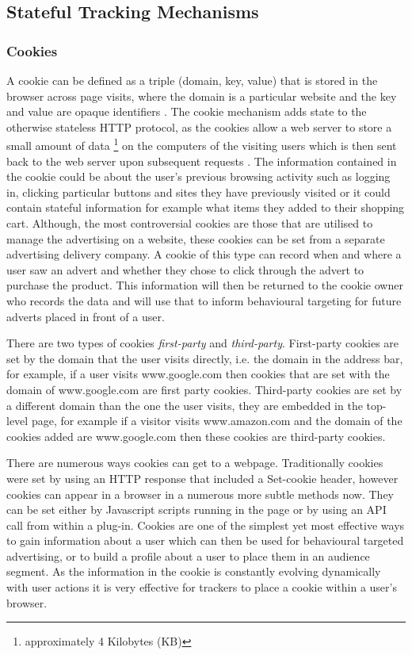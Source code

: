 \documentclass[12pt]{article}
\begin{document}
\subsection{Stateful Tracking Mechanisms}

\subsubsection {Cookies} \label{cookies}
A cookie can be defined as a triple (domain, key, value) that is stored in the browser across page visits, where the domain is a particular website and the key and value are opaque identifiers \parencite{roesner}. The cookie mechanism adds state to the otherwise stateless HTTP protocol, as the cookies allow a web server to store a small amount of data \footnote{approximately 4 Kilobytes (KB)} on the computers of the visiting users which is then sent back to the web server upon subsequent requests \parencite{cookielessMonster}. The information contained in the cookie could be about the user's previous browsing activity such as logging in, clicking particular buttons and sites they have previously visited or it could contain stateful information for example what items they added to their shopping cart. Although, the most controversial cookies are those that are utilised to manage the advertising on a website, these cookies can be set from a separate advertising delivery company. A cookie of this type can record when and where a user saw an advert and whether they chose to click through the advert to purchase the product. This information will then be returned to the cookie owner who records the data and will use that to inform behavioural targeting for future adverts placed in front of a user.  \newline 

There are two types of cookies \textit{first-party} and \textit{third-party}. First-party cookies are set by the domain that the user visits directly, i.e. the domain in the address bar, for example, if a user visits www.google.com then cookies that are set with the domain of www.google.com are first party cookies. Third-party cookies are set by a different domain than the one the user visits, they are embedded in the top-level page, for example if a visitor visits www.amazon.com and the domain of the cookies added are www.google.com then these cookies are third-party cookies. \newline

There are numerous ways cookies can get to a webpage. Traditionally cookies were set by using an HTTP response that included a Set-cookie header, however cookies can appear in a browser in a numerous more subtle methods now. They can be set either by Javascript scripts running in the page or by using an API call from within a plug-in. Cookies are one of the simplest yet most effective ways to gain information about a user which can then be used for behavioural targeted advertising, or to build a profile about a user to place them in an audience segment. As the information in the cookie is constantly evolving dynamically with user actions it is very effective for trackers to place a cookie within a user's browser. 
\end{document}
